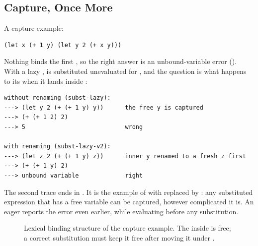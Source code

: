 \subsection{Capture, Once More}

A capture example:
\begin{lstlisting}
(let x (+ 1 y) (let y 2 (+ x y)))
\end{lstlisting}
Nothing binds the first , so the right answer is an unbound-variable error (). With a lazy ,  is substituted unevaluated for , and the question is what happens to its  when it lands inside :
\begin{lstlisting}[style=repl]
without renaming (subst-lazy):
---> (let y 2 (+ (+ 1 y) y))      the free y is captured
---> (+ (+ 1 2) 2)
---> 5                            wrong

with renaming (subst-lazy-v2):
---> (let z 2 (+ (+ 1 y) z))      inner y renamed to a fresh z first
---> (+ (+ 1 y) 2)
---> unbound variable             right
\end{lstlisting}
The second trace ends in . It is the example of   with  replaced by : any substituted expression that has a free variable can be captured, however complicated it is. An eager  reports the error even earlier, while evaluating  before any substitution.

\begin{figure}[htbp]
\centering
{}
\caption{Lexical binding structure of the capture example. The  inside  is free; a correct substitution must keep it free after moving it under .}
\label{fig:capture5}
\end{figure}

